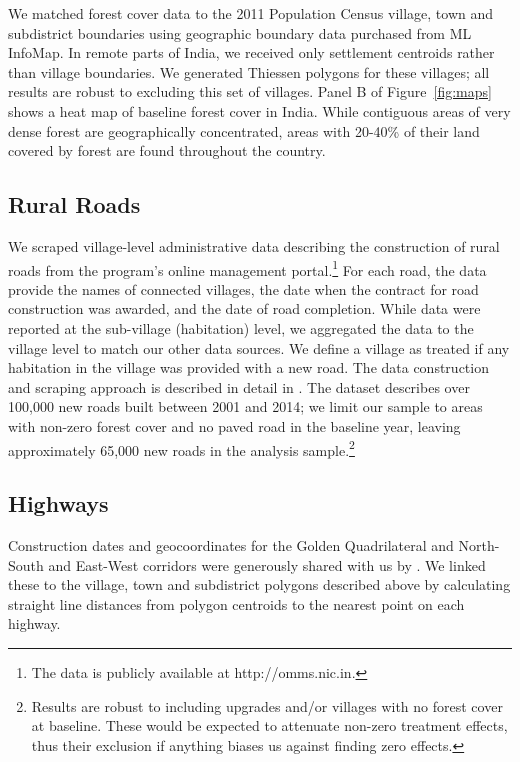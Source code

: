 We matched forest cover data to the 2011 Population Census village, town
and subdistrict boundaries using geographic boundary data purchased
from ML InfoMap. In remote parts of India, we received only settlement
centroids rather than village boundaries. We generated Thiessen
polygons for these villages; all results are robust to excluding this
set of villages. Panel B of Figure~\ref{fig:maps} shows a heat map of
baseline forest cover in India. While contiguous areas of very dense
forest are geographically concentrated, areas with 20-40\% of their
land covered by forest are found throughout the country.

\subsection{Rural Roads}

We scraped village-level administrative data describing the
construction of rural roads from the program's online management
portal.\footnote{The data is publicly available at
  http://omms.nic.in.} For each road, the data provide the names of connected
villages, the date when the contract for road construction was
awarded, and the date of road completion. While data were reported at
the sub-village (habitation) level, we aggregated the data to the
village level to match our other data sources. We define a village as
treated if any habitation in the village was provided with a new road.
The data construction and scraping approach is described in detail in
. The dataset describes over 100,000 new roads built
between 2001 and 2014; we limit our sample to areas with non-zero
forest cover and no paved road in the baseline year, leaving
approximately 65,000 new roads in the analysis
sample.\footnote{Results are robust to including upgrades and/or villages
  with no forest cover at baseline. These would be expected to
  attenuate non-zero treatment effects, thus their exclusion if
  anything biases us against finding zero effects.}

\subsection{Highways}

Construction dates and geocoordinates for the Golden Quadrilateral and
North-South and East-West corridors were generously shared with us by
. We linked these to the village, town and
subdistrict polygons described above by calculating straight line
distances from polygon centroids to the nearest point on each highway.

